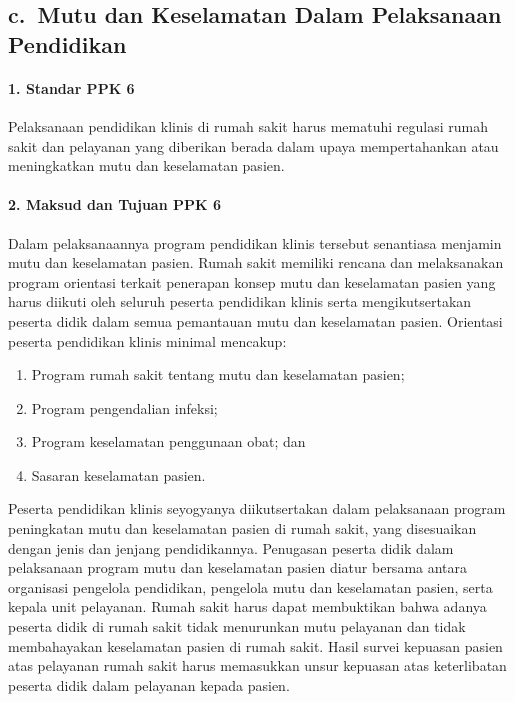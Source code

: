 \documentclass[
]{book}
\providecommand{\tightlist}{%
  \setlength{\itemsep}{0pt}\setlength{\parskip}{0pt}}
\begin{document}
\hypertarget{c.-mutu-dan-keselamatan-dalam-pelaksanaan-pendidikan}{%
\subsection*{c.~Mutu dan Keselamatan Dalam Pelaksanaan Pendidikan}\label{c.-mutu-dan-keselamatan-dalam-pelaksanaan-pendidikan}}

\hypertarget{standar-ppk-6}{%
\paragraph*{1. Standar PPK 6}\label{standar-ppk-6}}

Pelaksanaan pendidikan klinis di rumah sakit harus mematuhi regulasi rumah sakit dan pelayanan yang diberikan berada dalam upaya mempertahankan atau meningkatkan mutu dan keselamatan pasien.

\hypertarget{maksud-dan-tujuan-ppk-6}{%
\paragraph*{2. Maksud dan Tujuan PPK 6}\label{maksud-dan-tujuan-ppk-6}}

Dalam pelaksanaannya program pendidikan klinis tersebut senantiasa menjamin mutu dan keselamatan pasien. Rumah sakit memiliki rencana dan melaksanakan program orientasi terkait penerapan konsep mutu dan keselamatan pasien yang harus diikuti oleh seluruh peserta pendidikan klinis serta mengikutsertakan peserta didik dalam semua pemantauan mutu dan keselamatan pasien. Orientasi peserta pendidikan klinis minimal mencakup:

\begin{enumerate}
\def\labelenumi{\alph{enumi}.}
\tightlist
\item
  Program rumah sakit tentang mutu dan keselamatan pasien;
\item
  Program pengendalian infeksi;
\item
  Program keselamatan penggunaan obat; dan
\item
  Sasaran keselamatan pasien.
\end{enumerate}

Peserta pendidikan klinis seyogyanya diikutsertakan dalam pelaksanaan program peningkatan mutu dan keselamatan pasien di rumah sakit, yang disesuaikan dengan jenis dan jenjang pendidikannya. Penugasan peserta didik dalam pelaksanaan program mutu dan keselamatan pasien diatur bersama antara organisasi pengelola pendidikan, pengelola mutu dan keselamatan pasien, serta kepala unit pelayanan. Rumah sakit harus dapat membuktikan bahwa adanya peserta didik di rumah sakit tidak menurunkan mutu pelayanan dan tidak membahayakan keselamatan pasien di rumah sakit. Hasil survei kepuasan pasien atas pelayanan rumah sakit harus memasukkan unsur kepuasan atas keterlibatan peserta didik dalam pelayanan kepada pasien.
\end{document}

